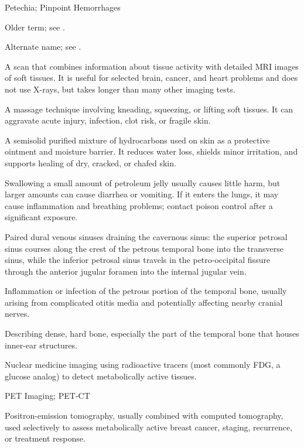 \synonyms
Petechia; Pinpoint Hemorrhages

 Older term; see .

 Alternate name; see .

 A scan that combines information about tissue activity with detailed MRI images of soft tissues. It is useful for selected brain, cancer, and heart problems and does not use X-rays, but takes longer than many other imaging tests.

 A massage technique involving kneading, squeezing, or lifting soft tissues. It can aggravate acute injury, infection, clot risk, or fragile skin.

 A semisolid purified mixture of hydrocarbons used on skin as a protective ointment and moisture barrier. It reduces water loss, shields minor irritation, and supports healing of dry, cracked, or chafed skin.

 Swallowing a small amount of petroleum jelly usually causes little harm, but larger amounts can cause diarrhea or vomiting. If it enters the lungs, it may cause inflammation and breathing problems; contact poison control after a significant exposure.

 Paired dural venous sinuses draining the cavernous sinus: the superior petrosal sinus courses along the crest of the petrous temporal bone into the transverse sinus, while the inferior petrosal sinus travels in the petro-occipital fissure through the anterior jugular foramen into the internal jugular vein.

 Inflammation or infection of the petrous portion of the temporal bone, usually arising from complicated otitis media and potentially affecting nearby cranial nerves.

 Describing dense, hard bone, especially the part of the temporal bone that houses inner-ear structures.

 Nuclear medicine imaging using radioactive tracers (most commonly FDG, a glucose analog)
to detect metabolically active tissues.

\synonyms
PET Imaging; PET-CT

 Positron-emission tomography, usually combined with computed tomography, used selectively to assess metabolically active breast cancer, staging, recurrence, or treatment response.

